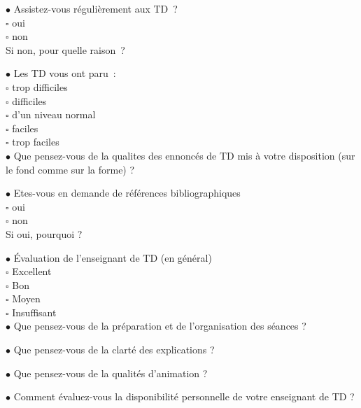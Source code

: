 \documentclass[10pt]{letter}
\begin{document}
$\bullet$ Assistez-vous régulièrement aux TD ? \\
$\square$ oui \\
$\square$ non \\
Si non, pour quelle raison ? \\
\vspace{1.0cm}


$\bullet$ Les TD vous ont paru : \\
$\square$ trop difficiles \\
$\square$ difficiles \\
$\square$ d'un niveau normal \\
$\square$ faciles \\
$\square$ trop faciles \\


$\bullet$ Que pensez-vous de la qualites des ennoncés de TD mis à votre disposition (sur le fond comme sur la forme) ? \\
\vspace{1.0cm}


$\bullet$ Etes-vous en demande de références bibliographiques \\
$\square$ oui \\
$\square$ non \\
Si oui, pourquoi ? \\
\vspace{1.0cm}


$\bullet$ Évaluation de l’enseignant de TD (en général) \\
$\square$ Excellent \\
$\square$ Bon \\
$\square$ Moyen \\
$\square$ Insuffisant \\


$\bullet$ Que pensez-vous de la préparation et de l'organisation des séances ? \\
\vspace{1.0cm}


$\bullet$ Que pensez-vous de la clarté des explications ? \\
\vspace{1.0cm}


$\bullet$ Que pensez-vous de la qualités d’animation ? \\
\vspace{1.0cm}


\newpage
$\bullet$ Comment évaluez-vous la disponibilité personnelle de votre enseignant de TD ? \\
\vspace{1.0cm}
\end{document}
